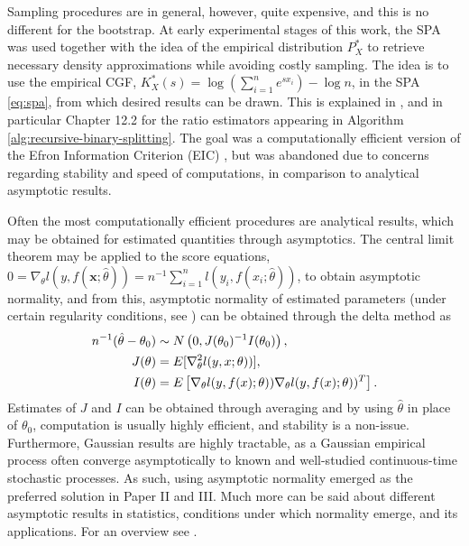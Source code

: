 Sampling procedures are in general, however, quite expensive, and this is no different for the bootstrap.
At early experimental stages of this work, the SPA was used together with the idea of the empirical distribution $P_X^*$ to retrieve necessary density approximations while avoiding costly sampling.
The idea is to use the empirical CGF, $K_X^*(s)=\log\left(\sum_{i=1}^{n} e^{sx_i}\right)-\log n$, in the SPA \eqref{eq:spa}, from which desired results can be drawn. 
This is explained in \citet[Chapter 14]{butler2007saddlepoint}, and in particular Chapter 12.2 for the ratio estimators appearing in Algorithm \ref{alg:recursive-binary-splitting}.
The goal was a computationally efficient version of the Efron Information Criterion (EIC) \citep{ishiguro1997bootstrapping}, but was abandoned due to concerns regarding stability and speed of computations, in comparison to analytical asymptotic results.

Often the most computationally efficient procedures are analytical results, which may be obtained for estimated quantities through asymptotics.
The central limit theorem may be applied to the score equations, $0=\nabla_\theta l(y,f(\mathbf{x};\hat{\theta}))=n^{-1}\sum_{i=1}^{n}l(y_i,f(x_i;\hat{\theta}))$, to obtain asymptotic normality, and from this, asymptotic normality of estimated parameters (under certain regularity conditions, see \citet{vanDerVaart}) can be obtained through the delta method as 
\begin{align}\label{eq:parameters-asymptotic-normality}
	n^{-1}(\hat{\theta}-\theta_0) &\sim N\left( 0, J(\theta_0)^{-1}I(\theta_0) \right),\\ 
	J(\theta) &= E[\nabla_\theta^2 l(y,x;\theta))],\notag\\
	I(\theta) &= E\left[ \nabla_\theta l(y,f(x);\theta))\nabla_\theta l(y,f(x);\theta))^T \right].\notag
\end{align}
Estimates of $J$ and $I$ can be obtained through averaging and by using $\hat\theta$ in place of $\theta_0$, computation is usually highly efficient, and stability is a non-issue.
Furthermore, Gaussian results are highly tractable, as a Gaussian empirical process often converge asymptotically to known and well-studied continuous-time stochastic processes.
As such, using asymptotic normality emerged as the preferred solution in Paper II and III.
Much more can be said about different asymptotic results in statistics, conditions under which normality emerge, and its applications. For an overview see \citet{vanDerVaart}.



